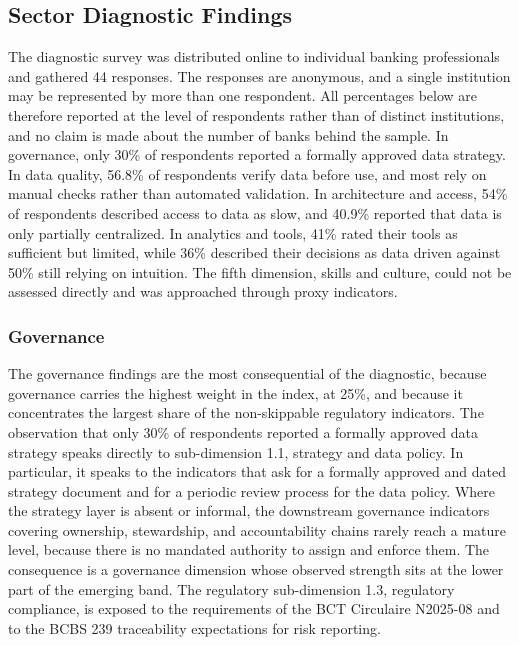 \subsection{Sector Diagnostic Findings}

The diagnostic survey was distributed online to individual banking professionals and gathered 44 responses. The responses are anonymous, and a single institution may be represented by more than one respondent. All percentages below are therefore reported at the level of respondents rather than of distinct institutions, and no claim is made about the number of banks behind the sample. In governance, only 30\% of respondents reported a formally approved data strategy. In data quality, 56.8\% of respondents verify data before use, and most rely on manual checks rather than automated validation. In architecture and access, 54\% of respondents described access to data as slow, and 40.9\% reported that data is only partially centralized. In analytics and tools, 41\% rated their tools as sufficient but limited, while 36\% described their decisions as data driven against 50\% still relying on intuition. The fifth dimension, skills and culture, could not be assessed directly and was approached through proxy indicators.

\subsubsection{Governance}

The governance findings are the most consequential of the diagnostic, because governance carries the highest weight in the index, at 25\%, and because it concentrates the largest share of the non-skippable regulatory indicators. The observation that only 30\% of respondents reported a formally approved data strategy speaks directly to sub-dimension 1.1, strategy and data policy. In particular, it speaks to the indicators that ask for a formally approved and dated strategy document and for a periodic review process for the data policy. Where the strategy layer is absent or informal, the downstream governance indicators covering ownership, stewardship, and accountability chains rarely reach a mature level, because there is no mandated authority to assign and enforce them. The consequence is a governance dimension whose observed strength sits at the lower part of the emerging band. The regulatory sub-dimension 1.3, regulatory compliance, is exposed to the requirements of the BCT Circulaire N\textdegree{}2025-08 and to the BCBS 239 traceability expectations for risk reporting.

